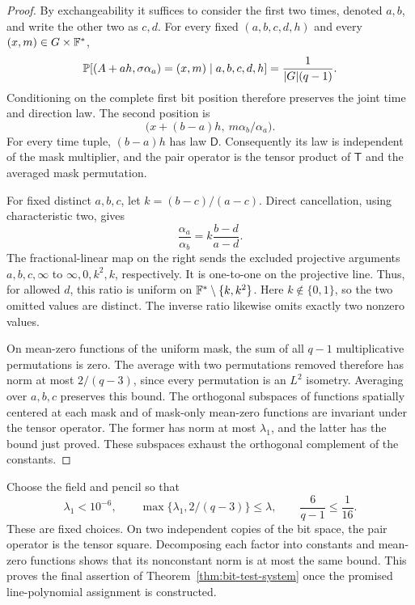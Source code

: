 \begin{proof}
By exchangeability it suffices to consider the first two times,
denoted $a,b$, and write the other two as $c,d$. For every fixed
$(a,b,c,d,h)$ and every $(x,m)\in G\times\mathbb F^*$,
\[
 \mathbb P[(A+ah,\sigma\alpha_a)=(x,m)\mid a,b,c,d,h]
 =\frac1{|G|(q-1)}.
\]
Conditioning on the complete first bit position therefore preserves
the joint time and direction law. The second position is
\[
 \bigl(x+(b-a)h,\ m\alpha_b/\alpha_a\bigr).
\]
For every time tuple, $(b-a)h$ has law $\mathsf D$. Consequently its
law is independent of the mask multiplier, and the pair operator is
the tensor product of $\mathsf T$ and the averaged mask permutation.

For fixed distinct $a,b,c$, let $k=(b-c)/(a-c)$. Direct cancellation,
using characteristic two, gives
\[
 \frac{\alpha_a}{\alpha_b}
 =k\frac{b-d}{a-d}.
\]
The fractional-linear map on the right sends the excluded projective
arguments $a,b,c,\infty$ to $\infty,0,k^2,k$, respectively. It is
one-to-one on the projective line. Thus, for allowed $d$, this ratio is
uniform on $\mathbb F^*\setminus\{k,k^2\}$. Here $k\notin\{0,1\}$, so the two
omitted values are distinct. The inverse ratio likewise omits exactly
two nonzero values.

On mean-zero functions of the uniform mask, the sum of all $q-1$
multiplicative permutations is zero. The average with two permutations
removed therefore has norm at most $2/(q-3)$, since every permutation is
an $L^2$ isometry. Averaging over $a,b,c$ preserves this bound. The
orthogonal subspaces of functions spatially centered at each mask and
of mask-only mean-zero functions are invariant under the tensor
operator. The former has norm at most $\lambda_1$, and the latter has
the bound just proved. These subspaces exhaust the orthogonal
complement of the constants.
\end{proof}

Choose the field and pencil so that
\begin{equation}\label{eq:fixed-field-smallness}
 \lambda_1<10^{-6},\qquad
 \max\{\lambda_1,2/(q-3)\}\leq\lambda,\qquad
 \frac6{q-1}\leq\frac1{16}.
\end{equation}
These are fixed choices. On two independent copies of the bit space,
the pair operator is the tensor square. Decomposing each factor into
constants and mean-zero functions shows that its nonconstant norm is
at most the same bound. This proves the final assertion of
Theorem~\ref{thm:bit-test-system} once the promised line-polynomial
assignment is constructed.

